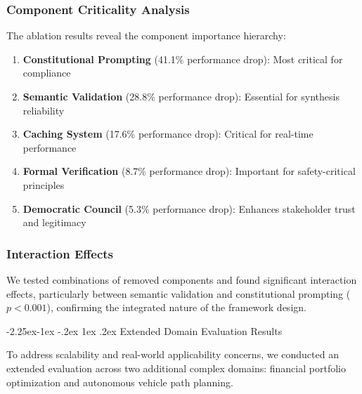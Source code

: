 \documentclass[manuscript,screen,review,anonymous,9pt]{acmart}
\makeatletter
\renewcommand\subsection{\@startsection{subsection}{2}{\z@}%
  {-2.25ex\@plus -1ex \@minus -.2ex}%
  {1ex \@plus .2ex}%
  {\normalfont\large\bfseries}}
\makeatother
\begin{document}
\subsubsection{Component Criticality Analysis}
The ablation results reveal the component importance hierarchy:

\begin{enumerate}
	\item \textbf{Constitutional Prompting} (41.1\% performance drop): Most critical for compliance
	\item \textbf{Semantic Validation} (28.8\% performance drop): Essential for synthesis reliability
	\item \textbf{Caching System} (17.6\% performance drop): Critical for real-time performance
	\item \textbf{Formal Verification} (8.7\% performance drop): Important for safety-critical principles
	\item \textbf{Democratic Council} (5.3\% performance drop): Enhances stakeholder trust and legitimacy
\end{enumerate}

\subsubsection{Interaction Effects}
We tested combinations of removed components and found significant interaction effects, particularly between semantic validation and constitutional prompting ($p < 0.001$), confirming the integrated nature of the framework design.

\subsection{Extended Domain Evaluation Results}
\label{subsec:extended_evaluation}

To address scalability and real-world applicability concerns, we conducted an extended evaluation across two additional complex domains: financial portfolio optimization and autonomous vehicle path planning.
\end{document}
